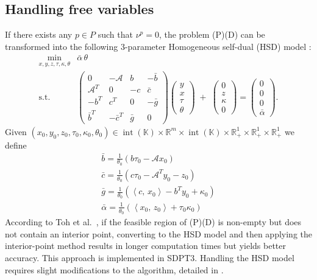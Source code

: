 \documentclass{scrartcl}
\newcommand{\inprod}[2]{\left\langle #1, \, #2 \right\rangle}
\begin{document}
\subsection{Handling free variables}
If there exists any $p \in P$ such that $\nu^p = 0$, the problem (P)(D) can be transformed into the following 3-parameter Homogeneous self-dual (HSD) model \cite{Wright1997}:
\[
  \begin{array}{cl}
   \min_{x,y,z,\tau,\kappa,\theta} & \bar{\alpha}\,\theta \\[3pt]
   \text{s.t.}
   & \begin{pmatrix}
       0 & -\mathcal{A} & b & -\bar{b}\\
       \mathcal{A}^T & 0 & -c & \bar{c}\\
       -b^T & c^T & 0 & -\bar{g}\\
       \bar{b}^T & -\bar{c}^T & \bar{g} & 0
     \end{pmatrix}
     \begin{pmatrix} y \\ x \\ \tau \\ \theta \end{pmatrix}
   \;+\;
     \begin{pmatrix} 0 \\ z \\ \kappa \\ 0 \end{pmatrix}
   =
     \begin{pmatrix} 0 \\ 0 \\ 0 \\ \bar{\alpha} \end{pmatrix}.
  \end{array}
\]
Given $(x_0,y_0,z_0,\tau_0,\kappa_0,\theta_0)\in 
  \operatorname{int}(\mathbb{K}) \times \mathbb{R}^m \times \operatorname{int}(\mathbb{K})
  \times \mathbb{R}^1_+ \times \mathbb{R}^1_+ \times \mathbb{R}^1_+$
we define
\begin{gather*}
    \bar{b} = \frac{1}{\theta_0}(b\tau_0 - \mathcal{A}x_0) \\
    \bar{c} = \frac{1}{\theta_0}(c\tau_0 - \mathcal{A}^T y_0 - z_0) \\
    \bar{g} = \frac{1}{\theta_0}(\inprod{c}{x_0} - b^Ty_0 + \kappa_0) \\
    \bar{\alpha} = \frac{1}{\theta_0} (\inprod{x_0}{z_0} + \tau_0 \kappa_0)
\end{gather*}
According to Toh et al.~\cite{toh1999}, if the feasible region of (P)(D) is non-empty but does not contain an interior point, converting to the HSD model and then applying the interior-point method results in longer computation times but yields better accuracy. This approach is implemented in SDPT3.  
Handling the HSD model requires slight modifications to the algorithm, detailed in \cite{toh1999}.
\end{document}

